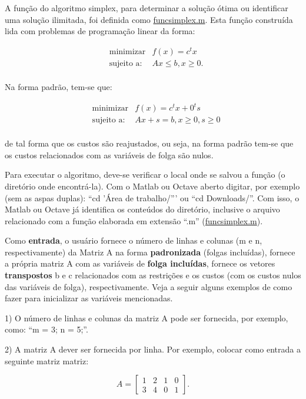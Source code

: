 \documentclass[10pt]{article}
\begin{document}
A função do algoritmo simplex, para determinar a solução ótima ou identificar uma solução ilimitada, foi definida como \underline{funcsimplex.m}. Esta função construída lida com problemas de programação linear da forma:

\begin{align*}
&\text{minimizar}& f(x) = c^{t}x\\  
&\text{sujeito a:}& Ax \le b, x \ge 0.\\
\end{align*}  

Na forma padrão, tem-se que:

\begin{align*}
&\text{minimizar}& f(x) = c^{t}x + 0^{t}s\\  
&\text{sujeito a:}& Ax + s = b, x \ge 0, s \ge 0\\
\end{align*}  

de tal forma que os custos são reajustados, ou seja, na forma padrão tem-se que os custos relacionados com as variáveis de folga são nulos.
\newline

Para executar o algoritmo, deve-se verificar o local onde se salvou a função (o diretório onde encontrá-la). Com o Matlab ou Octave aberto digitar, por exemplo (sem as aspas duplas): ``cd 'Área de trabalho/''' ou ``cd Downloads/''. Com isso, o Matlab ou Octave já identifica os conteúdos do diretório, inclusive o arquivo relacionado com a função elaborada em extensão ``.m'' (\underline{funcsimplex.m}).
\newline

Como \textbf{entrada}, o usuário fornece o número de linhas e colunas (m e n, respectivamente) da Matriz A na forma \textbf{padronizada} (folgas incluídas), fornece a própria matriz A com as variáveis de \textbf{folga incluídas}, fornece os vetores \textbf{transpostos} b e c relacionados com as restrições e os custos (com os custos nulos das variáveis de folga), respectivamente. Veja a seguir alguns exemplos de como fazer para inicializar as variáveis mencionadas.
\newline

1) O número de linhas e colunas da matriz A pode ser fornecida, por exemplo, como: ``m = 3; n = 5;''.
\newline

2) A matriz A dever ser fornecida por linha. Por exemplo, colocar como entrada a seguinte matriz matriz:

\[
A =
  \begin{bmatrix}
    1 & 2 & 1 & 0\\
    3 & 4 & 0 & 1
  \end{bmatrix}.
\]
\newline
\end{document}
